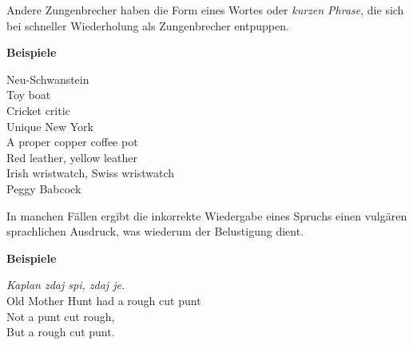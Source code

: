\documentclass[
  letterpaper,
]{scrbook}
\begin{document}
Andere Zungenbrecher haben die Form eines Wortes oder \emph{kurzen
Phrase}, die sich bei schneller Wiederholung als Zungenbrecher
entpuppen.

\begin{tcolorbox}[enhanced jigsaw, opacityback=0, colback=white, breakable, toprule=.15mm, rightrule=.15mm, bottomrule=.15mm, colframe=quarto-callout-note-color-frame, arc=.35mm, leftrule=.75mm, left=2mm]
\begin{minipage}[t]{5.5mm}
\textcolor{quarto-callout-note-color}{\faInfo}
\end{minipage}%
\begin{minipage}[t]{\textwidth - 5.5mm}

\textbf{Beispiele}\vspace{2mm}

Neu-Schwanstein\\

Toy boat\\
Cricket critic\\
Unique New York\\
A proper copper coffee pot\\
Red leather, yellow leather\\
Irish wristwatch, Swiss wristwatch\\
Peggy Babcock\\

\end{minipage}%
\end{tcolorbox}

In manchen Fällen ergibt die inkorrekte Wiedergabe eines Spruchs einen
vulgären sprachlichen Ausdruck, was wiederum der Belustigung dient.

\begin{tcolorbox}[enhanced jigsaw, opacityback=0, colback=white, breakable, toprule=.15mm, rightrule=.15mm, bottomrule=.15mm, colframe=quarto-callout-note-color-frame, arc=.35mm, leftrule=.75mm, left=2mm]
\begin{minipage}[t]{5.5mm}
\textcolor{quarto-callout-note-color}{\faInfo}
\end{minipage}%
\begin{minipage}[t]{\textwidth - 5.5mm}

\textbf{Beispiele}\vspace{2mm}

\emph{Kaplan zdaj spi, zdaj je.}\\

Old Mother Hunt had a rough cut punt\\
Not a punt cut rough,\\
But a rough cut punt.\\

\end{minipage}%
\end{tcolorbox}
\end{document}
